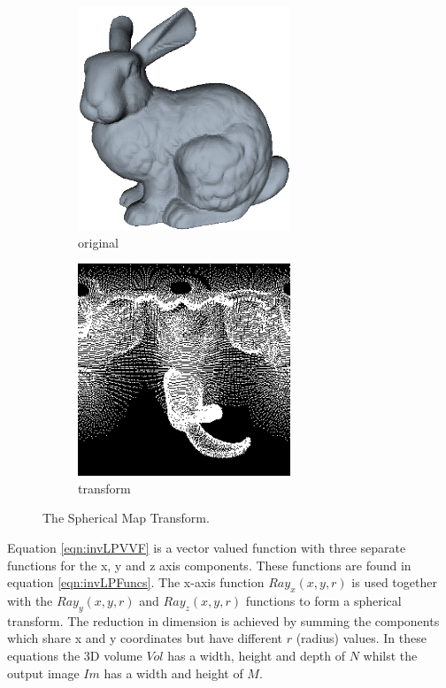 \begin{figure}[!htb]
        \centering
        \begin{subfigure}[b]{2.5in}
                \includegraphics[width=2.5in]{images/ch2/bunny}
                \caption{original}
                \label{fig:bunnyOrigAA}
        \end{subfigure}
        \begin{subfigure}[b]{2.5in}
                \includegraphics[width=2.5in]{images/ch2/spherical2DMap}
                \caption{transform}
                \label{fig:bunnySPTed}
        \end{subfigure}%
        \caption{The Spherical Map Transform.}
       \label{fig:smtExample}
\end{figure}


Equation \ref{eqn:invLPVVF} is a vector valued function with three separate functions for the x, y and z axis components. These functions are found in equation \ref{eqn:invLPFuncs}. The x-axis function $Ray_x(x,y,r)$ is used together with the $Ray_y(x,y,r)$ and $Ray_z(x,y,r)$ functions to form a spherical transform. The reduction in dimension is achieved by summing the components which share x and y coordinates but have different $r$ (radius) values. In these equations the 3D volume $Vol$ has a width, height and depth of $N$ whilst the output image $Im$ has a width and height of $M$. \\


